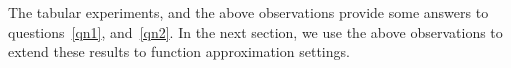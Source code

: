 
The tabular experiments, and the above observations provide some answers to questions~\ref{qn1},
and~\ref{qn2}.
In the next section, we use the above observations to extend these results to function
approximation settings.


